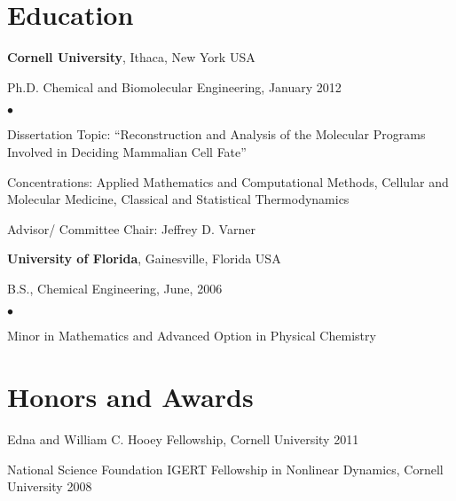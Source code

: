 \documentclass[margin,line]{res}
\newenvironment{list1}{
  \begin{list}{\ding{113}}{%
      \setlength{\itemsep}{0in}
      \setlength{\parsep}{0in} \setlength{\parskip}{0in}
      \setlength{\topsep}{0in} \setlength{\partopsep}{0in} 
      \setlength{\leftmargin}{0.17in}}}{\end{list}}
\newenvironment{list2}{
  \begin{list}{$\bullet$}{%
      \setlength{\itemsep}{0in}
      \setlength{\parsep}{0in} \setlength{\parskip}{0in}
      \setlength{\topsep}{0in} \setlength{\partopsep}{0in} 
      \setlength{\leftmargin}{0.2in}}}{\end{list}}
\begin{document}
\begin{resume}
\section{\sc Education}
{\bf Cornell University}, Ithaca, New York USA\\
\vspace*{-.1in}
\begin{list1}
\item[] Ph.D. Chemical and Biomolecular Engineering, January 2012 
\begin{list2}
\vspace*{.05in}
\item Dissertation Topic:  ``Reconstruction and Analysis of the Molecular 
Programs Involved in Deciding Mammalian Cell Fate'' 
\item Concentrations: Applied Mathematics and Computational Methods, Cellular and Molecular Medicine, Classical and Statistical Thermodynamics 
\item Advisor/ Committee Chair:  Jeffrey D. Varner
\end{list2}
\end{list1}

{\bf University of Florida}, Gainesville, Florida USA\\
\vspace*{-.1in}
\begin{list1}
\item[] B.S., Chemical Engineering,  June, 2006
\begin{list2}
\vspace*{.05in}
\item Minor in Mathematics and Advanced Option in Physical Chemistry
\end{list2}
\end{list1}


\section{\sc Honors and Awards}
Edna and William C. Hooey Fellowship, Cornell University 2011

\vspace*{-2.5mm}
National Science Foundation IGERT Fellowship in Nonlinear Dynamics, Cornell University 2008


\end{resume}
\end{document}
